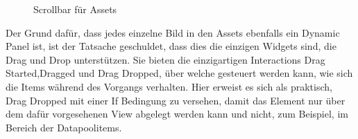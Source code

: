 \begin{figure}%
\centering
{}%
\qquad
{}%

\caption{Scrollbar für Assets}%
\label{fig:Prototyp_02}
\end{figure}

Der Grund dafür, dass jedes einzelne Bild in den Assets ebenfalls ein Dynamic Panel ist, ist der Tatsache geschuldet, dass dies die einzigen Widgets sind, die Drag und Drop unterstützen.
Sie bieten die einzigartigen Interactions \glqq Drag Started\grqq{},\glqq Dragged\grqq{} und \glqq Drag Dropped\grqq{}, über welche gesteuert werden kann, wie sich die Items während des Vorgangs verhalten.
Hier erweist es sich als praktisch, \glqq Drag Dropped\grqq{} mit einer If Bedingung zu versehen, damit das Element nur über dem dafür vorgesehenen View abgelegt werden kann und nicht, zum Beispiel, im Bereich der Datapoolitems.

